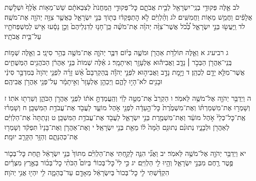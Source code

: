 \documentclass[twoside, openany, parskip=half, 11pt]{book}
\begin{document}
לב אֵ֛לֶּה פְּקוּדֵ֥י בְנֵֽי־יִשְׂרָאֵ֖ל לְבֵ֣ית אֲבֹתָ֑ם כׇּל־פְּקוּדֵ֤י הַֽמַּחֲנֹת֙ לְצִבְאֹתָ֔ם שֵׁשׁ־מֵא֥וֹת אֶ֙לֶף֙ וּשְׁלֹ֣שֶׁת אֲלָפִ֔ים וַחֲמֵ֥שׁ מֵא֖וֹת וַחֲמִשִּֽׁים׃ לג וְהַ֨לְוִיִּ֔ם לֹ֣א הׇתְפָּקְד֔וּ בְּת֖וֹךְ בְּנֵ֣י יִשְׂרָאֵ֑ל כַּאֲשֶׁ֛ר צִוָּ֥ה יְהֹוָ֖ה אֶת־מֹשֶֽׁה׃ לד וַֽיַּעֲשׂ֖וּ בְּנֵ֣י יִשְׂרָאֵ֑ל כְּ֠כֹ֠ל אֲשֶׁר־צִוָּ֨ה יְהֹוָ֜ה אֶת־מֹשֶׁ֗ה כֵּֽן־חָנ֤וּ לְדִגְלֵיהֶם֙ וְכֵ֣ן נָסָ֔עוּ אִ֥ישׁ לְמִשְׁפְּחֹתָ֖יו עַל־בֵּ֥ית אֲבֹתָֽיו׃

ג רביעיג א וְאֵ֛לֶּה תּוֹלְדֹ֥ת אַהֲרֹ֖ן וּמֹשֶׁ֑ה בְּי֗וֹם דִּבֶּ֧ר יְהֹוָ֛ה אֶת־מֹשֶׁ֖ה בְּהַ֥ר סִינָֽי׃ ב וְאֵ֛לֶּה שְׁמ֥וֹת בְּֽנֵי־אַהֲרֹ֖ן הַבְּכֹ֣ר ׀ נָדָ֑ב וַאֲבִיה֕וּא אֶלְעָזָ֖ר וְאִיתָמָֽר׃ ג אֵ֗לֶּה שְׁמוֹת֙ בְּנֵ֣י אַהֲרֹ֔ן הַכֹּהֲנִ֖ים הַמְּשֻׁחִ֑ים אֲשֶׁר־מִלֵּ֥א יָדָ֖ם לְכַהֵֽן׃ ד וַיָּ֣מׇת נָדָ֣ב וַאֲבִיה֣וּא לִפְנֵ֣י יְהֹוָ֡ה בְּֽהַקְרִבָם֩ אֵ֨שׁ זָרָ֜ה לִפְנֵ֤י יְהֹוָה֙ בְּמִדְבַּ֣ר סִינַ֔י וּבָנִ֖ים לֹא־הָי֣וּ לָהֶ֑ם וַיְכַהֵ֤ן אֶלְעָזָר֙ וְאִ֣יתָמָ֔ר עַל־פְּנֵ֖י אַהֲרֹ֥ן אֲבִיהֶֽם׃

ה וַיְדַבֵּ֥ר יְהֹוָ֖ה אֶל־מֹשֶׁ֥ה לֵּאמֹֽר׃ ו הַקְרֵב֙ אֶת־מַטֵּ֣ה לֵוִ֔י וְהַֽעֲמַדְתָּ֣ אֹת֔וֹ לִפְנֵ֖י אַהֲרֹ֣ן הַכֹּהֵ֑ן וְשֵׁרְת֖וּ אֹתֽוֹ׃ ז וְשָׁמְר֣וּ אֶת־מִשְׁמַרְתּ֗וֹ וְאֶת־מִשְׁמֶ֙רֶת֙ כׇּל־הָ֣עֵדָ֔ה לִפְנֵ֖י אֹ֣הֶל מוֹעֵ֑ד לַעֲבֹ֖ד אֶת־עֲבֹדַ֥ת הַמִּשְׁכָּֽן׃ ח וְשָׁמְר֗וּ אֶֽת־כׇּל־כְּלֵי֙ אֹ֣הֶל מוֹעֵ֔ד וְאֶת־מִשְׁמֶ֖רֶת בְּנֵ֣י יִשְׂרָאֵ֑ל לַעֲבֹ֖ד אֶת־עֲבֹדַ֥ת הַמִּשְׁכָּֽן׃ ט וְנָתַתָּה֙ אֶת־הַלְוִיִּ֔ם לְאַהֲרֹ֖ן וּלְבָנָ֑יו נְתוּנִ֨ם נְתוּנִ֥ם הֵ֙מָּה֙ ל֔וֹ מֵאֵ֖ת בְּנֵ֥י יִשְׂרָאֵֽל׃ י וְאֶת־אַהֲרֹ֤ן וְאֶת־בָּנָיו֙ תִּפְקֹ֔ד וְשָׁמְר֖וּ אֶת־כְּהֻנָּתָ֑ם וְהַזָּ֥ר הַקָּרֵ֖ב יוּמָֽת׃

יא וַיְדַבֵּ֥ר יְהֹוָ֖ה אֶל־מֹשֶׁ֥ה לֵּאמֹֽר׃ יב וַאֲנִ֞י הִנֵּ֧ה לָקַ֣חְתִּי אֶת־הַלְוִיִּ֗ם מִתּוֹךְ֙ בְּנֵ֣י יִשְׂרָאֵ֔ל תַּ֧חַת כׇּל־בְּכ֛וֹר פֶּ֥טֶר רֶ֖חֶם מִבְּנֵ֣י יִשְׂרָאֵ֑ל וְהָ֥יוּ לִ֖י הַלְוִיִּֽם׃ יג כִּ֣י לִי֮ כׇּל־בְּכוֹר֒ בְּיוֹם֩ הַכֹּתִ֨י כׇל־בְּכ֜וֹר בְּאֶ֣רֶץ מִצְרַ֗יִם הִקְדַּ֨שְׁתִּי לִ֤י כׇל־בְּכוֹר֙ בְּיִשְׂרָאֵ֔ל מֵאָדָ֖ם עַד־בְּהֵמָ֑ה לִ֥י יִהְי֖וּ אֲנִ֥י יְהֹוָה׃
\end{document}
